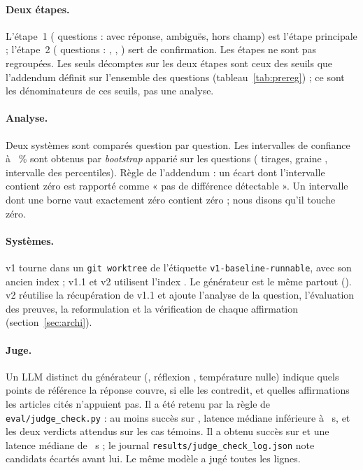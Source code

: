\paragraph{Deux étapes.} L'étape~1 (\EvSoneItems{} questions : \EvSoneAnswer{} avec réponse, \EvSoneClarify{} ambiguës,
\EvSoneRefuse{} hors champ) est l'étape principale ; l'étape~2 (\EvStwoItems{} questions : \EvStwoAnswer{}, \EvStwoClarify,
\EvStwoRefuse) sert de confirmation. Les étapes ne sont pas regroupées. Les seuls décomptes sur les deux étapes sont ceux des
seuils que l'addendum définit sur l'ensemble des questions (tableau~\ref{tab:prereg}) ; ce sont les dénominateurs de ces seuils,
pas une analyse.

\paragraph{Analyse.} Deux systèmes sont comparés question par question. Les intervalles de confiance à \EvLevel~\% sont obtenus
par \emph{bootstrap} apparié sur les questions (\EvBoot{} tirages, graine \EvSeed, intervalle des percentiles). Règle de
l'addendum : un écart dont l'intervalle contient zéro est rapporté comme « pas de différence détectable ». Un intervalle dont
une borne vaut exactement zéro contient zéro ; nous disons qu'il touche zéro.

\paragraph{Systèmes.} v1 tourne dans un \texttt{git worktree} de l'étiquette \texttt{v1-baseline-runnable}, avec son ancien
index ; v1.1 et v2 utilisent l'index \texttt{\EvPreIndex}. Le générateur est le même partout (\texttt{\EvRowModel}). v2
réutilise la récupération de v1.1 et ajoute l'analyse de la question, l'évaluation des preuves, la reformulation et la
vérification de chaque affirmation (section~\ref{sec:archi}).

\paragraph{Juge.} Un LLM distinct du générateur (\texttt{\EvPreJudge}, réflexion \emph{\EvPreJudgeThinking}, température nulle)
indique quels points de référence la réponse couvre, si elle les contredit, et quelles affirmations les articles cités
n'appuient pas. Il a été retenu par la règle de \texttt{eval/judge\_check.py} : au moins \EvJudgeRuleOk{} succès sur
\EvJudgeRuleN, latence médiane inférieure à \EvJudgeRuleSeconds{}~s, et les deux verdicts attendus sur les cas témoins. Il a
obtenu \EvJudgeCheckOk{} succès sur \EvJudgeCheckN{} et une latence médiane de \EvJudgeCheckLatency{}~s ; le journal
\texttt{results/judge\_check\_log.json} note \EvJudgeRejected{} candidats écartés avant lui. Le même modèle a jugé toutes les
lignes.

